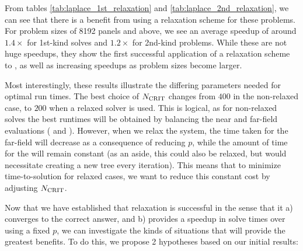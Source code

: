 From tables \ref{tab:laplace_1st_relaxation} and \ref{tab:laplace_2nd_relaxation}, we can see that there is a benefit from using a relaxation scheme for these problems. For problem sizes of 8192 panels and above, we see an average speedup of around $1.4\times$ for 1st-kind solves and $1.2\times$ for 2nd-kind problems. While these are not huge speedups, they show the first successful application of a relaxation scheme to {\fmmbem}, as well as increasing speedups as problem sizes become larger.

Most interestingly, these results illustrate the differing parameters needed for optimal run times. The best choice of $N_{\text{CRIT}}$ changes from $400$ in the non-relaxed case, to $200$ when a relaxed solver is used. This is logical, as for non-relaxed solves the best runtimes will be obtained by balancing the near and far-field evaluations ({\ptop} and {\mtol}). However, when we relax the system, the time taken for the far-field will decrease as a consequence of reducing $p$, while the amount of time for the {\ptop} will remain constant (as an aside, this could also be relaxed, but would necessitate creating a new tree every iteration). This means that to minimize time-to-solution for relaxed cases, we want to reduce this constant {\ptop} cost by adjusting $N_{\text{CRIT}}$.


Now that we have established that relaxation is successful in the sense that it a) converges to the correct answer, and b) provides a speedup in solve times over using a fixed $p$, we can investigate the kinds of situations that will provide the greatest benefits. To do this, we propose 2 hypotheses based on our initial results:

